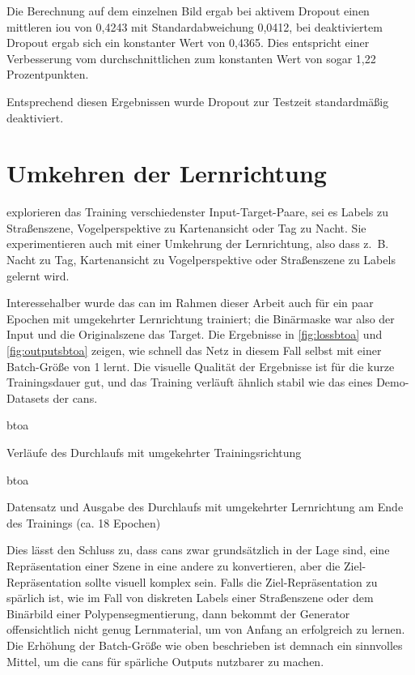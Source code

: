 Die Berechnung auf dem einzelnen Bild ergab bei aktivem Dropout einen mittleren \gls{iou} von 0,4243 mit Standardabweichung 0,0412, bei deaktiviertem Dropout ergab sich ein konstanter Wert von 0,4365.
Dies entspricht einer Verbesserung vom durchschnittlichen zum konstanten Wert von sogar 1,22 Prozentpunkten.

Entsprechend diesen Ergebnissen wurde Dropout zur Testzeit standardmäßig deaktiviert.



\section{Umkehren der Lernrichtung}

\citeauthor{Isola.2017} explorieren das Training verschiedenster Input-Target-Paare, sei es Labels zu Straßenszene, Vogelperspektive zu Kartenansicht oder Tag zu Nacht.
Sie experimentieren auch mit einer Umkehrung der Lernrichtung, also dass z.~B. Nacht zu Tag, Kartenansicht zu Vogelperspektive oder Straßenszene zu Labels gelernt wird.

Interessehalber wurde das \gls{can} im Rahmen dieser Arbeit auch für ein paar Epochen mit umgekehrter Lernrichtung trainiert; die Binärmaske war also der Input und die Originalszene das Target.
Die Ergebnisse in \autoref{fig:lossbtoa} und \autoref{fig:outputsbtoa} zeigen, wie schnell das Netz in diesem Fall selbst mit einer Batch-Größe von 1 lernt.
Die visuelle Qualität der Ergebnisse ist für die kurze Trainingsdauer gut, und das Training verläuft ähnlich stabil wie das eines Demo-Datasets der \glspl{can}.

\begin{losseswoiou}{btoa}
	\caption{Verläufe des Durchlaufs mit umgekehrter Trainingsrichtung}
	\label{fig:lossbtoa}
\end{losseswoiou}

\begin{outputs}{btoa}
	\caption[Datensatz und Ausgabe des Durchlaufs mit umgekehrter Lernrichtung am Ende des Trainings]{Datensatz und Ausgabe des Durchlaufs mit umgekehrter Lernrichtung am Ende des Trainings (ca. 18 Epochen)}
	\label{fig:outputsbtoa}
\end{outputs}

Dies lässt den Schluss zu, dass \glspl{can} zwar grundsätzlich in der Lage sind, eine Repräsentation einer Szene in eine andere zu konvertieren, aber die Ziel-Repräsentation sollte visuell komplex sein.
Falls die Ziel-Repräsentation zu spärlich ist, wie im Fall von diskreten Labels einer Straßenszene oder dem Binärbild einer Polypensegmentierung, dann bekommt der Generator offensichtlich nicht genug Lernmaterial, um von Anfang an erfolgreich zu lernen.
Die Erhöhung der Batch-Größe wie oben beschrieben ist demnach ein sinnvolles Mittel, um die \glspl{can} für spärliche Outputs nutzbarer zu machen.



